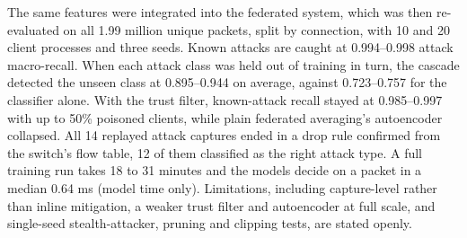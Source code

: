 \documentclass[12pt,a4paper]{report}
\begin{document}
The same features were integrated into the federated system, which was then re-evaluated on all 1.99 million unique packets, split by connection, with 10 and 20 client processes and three seeds. Known attacks are caught at 0.994--0.998 attack macro-recall. When each attack class was held out of training in turn, the cascade detected the unseen class at 0.895--0.944 on average, against 0.723--0.757 for the classifier alone. With the trust filter, known-attack recall stayed at 0.985--0.997 with up to 50\% poisoned clients, while plain federated averaging's autoencoder collapsed. All 14 replayed attack captures ended in a drop rule confirmed from the switch's flow table, 12 of them classified as the right attack type. A full training run takes 18 to 31 minutes and the models decide on a packet in a median 0.64 ms (model time only). Limitations, including capture-level rather than inline mitigation, a weaker trust filter and autoencoder at full scale, and single-seed stealth-attacker, pruning and clipping tests, are stated openly.
\end{document}
